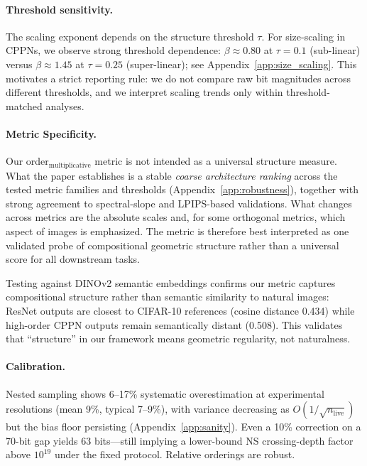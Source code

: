 \documentclass{article}
\begin{document}
\paragraph{Threshold sensitivity.} The scaling exponent depends on the structure threshold $\tau$. For size-scaling in CPPNs, we observe strong threshold dependence: $\beta \approx 0.80$ at $\tau=0.1$ (sub-linear) versus $\beta \approx 1.45$ at $\tau=0.25$ (super-linear); see Appendix~\ref{app:size_scaling}. This motivates a strict reporting rule: we do not compare raw bit magnitudes across different thresholds, and we interpret scaling trends only within threshold-matched analyses.

\paragraph{Metric Specificity.} Our order$_{\text{multiplicative}}$ metric is not intended as a universal structure measure. What the paper establishes is a stable \emph{coarse architecture ranking} across the tested metric families and thresholds (Appendix~\ref{app:robustness}), together with strong agreement to spectral-slope and LPIPS-based validations. What changes across metrics are the absolute scales and, for some orthogonal metrics, which aspect of images is emphasized. The metric is therefore best interpreted as one validated probe of compositional geometric structure rather than a universal score for all downstream tasks.

Testing against DINOv2 semantic embeddings \cite{oquab2023dinov2} confirms our metric captures compositional structure rather than semantic similarity to natural images: ResNet outputs are closest to CIFAR-10 references (cosine distance 0.434) while high-order CPPN outputs remain semantically distant (0.508). This validates that ``structure'' in our framework means geometric regularity, not naturalness.

\paragraph{Calibration.} Nested sampling shows 6--17\% systematic overestimation at experimental resolutions (mean 9\%, typical 7--9\%), with variance decreasing as $O(1/\sqrt{n_{\text{live}}})$ but the bias floor persisting (Appendix~\ref{app:sanity}). Even a 10\% correction on a 70-bit gap yields 63 bits---still implying a lower-bound NS crossing-depth factor above $10^{19}$ under the fixed protocol. Relative orderings are robust.
\end{document}
